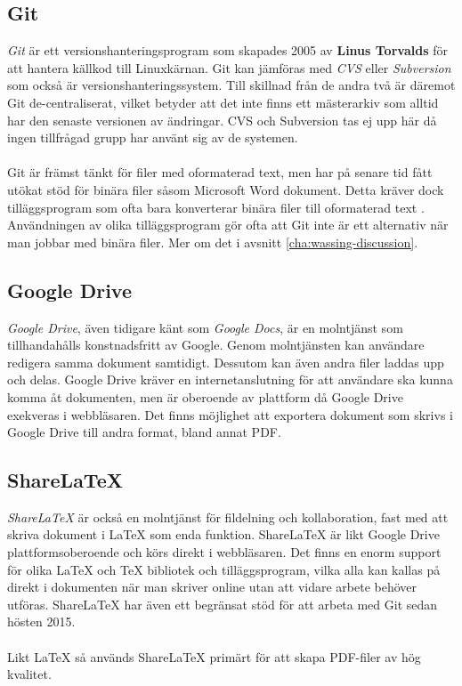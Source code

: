 \subsection{Git}
\label{sec:wassing-git}
\textit{Git} är ett versionshanteringsprogram som skapades 2005 av \textbf{Linus Torvalds} för att hantera källkod till Linuxkärnan. \cite{website:git} \cite{website:git_version_control} Git kan jämföras med \textit{CVS} eller \textit{Subversion} som också är versionshanteringssystem. Till skillnad från de andra två är däremot Git de-centraliserat, vilket betyder att det inte finns ett mästerarkiv som alltid har den senaste versionen av ändringar.\cite{website:centralized_version_control} CVS och Subversion tas ej upp här då ingen tillfrågad grupp har använt sig av de systemen.
\\ \\
Git är främst tänkt för filer med oformaterad text, men har på senare tid fått utökat stöd för binära filer såsom Microsoft Word dokument. Detta kräver dock tilläggsprogram som ofta bara konverterar binära filer till oformaterad text \cite{website:using_git_with_word}. Användningen av olika tilläggsprogram gör ofta att Git inte är ett alternativ när man jobbar med binära filer. Mer om det i avsnitt \ref{cha:wassing-discussion}.

\subsection{Google Drive}
\textit{Google Drive}, även tidigare känt som \textit{Google Docs}, är en molntjänst som tillhandahålls konstnadsfritt av Google.\cite{website:googledrive} Genom molntjänsten kan användare redigera samma dokument samtidigt. Dessutom kan även andra filer laddas upp och delas. Google Drive kräver en internetanslutning för att användare ska kunna komma åt dokumenten, men är oberoende av plattform då Google Drive exekveras i webbläsaren. Det finns möjlighet att exportera dokument som skrivs i Google Drive till andra format, bland annat PDF.

\subsection{ShareLaTeX}
\textit{ShareLaTeX} är också en molntjänst för fildelning och kollaboration, fast med att skriva dokument i LaTeX som enda funktion.\cite{website:sharelatex} ShareLaTeX  är likt Google Drive plattformsoberoende och körs direkt i webbläsaren. Det finns en enorm support för olika LaTeX och TeX bibliotek och tilläggsprogram, vilka alla kan kallas på direkt i dokumenten när man skriver online utan att vidare arbete behöver utföras. ShareLaTeX har även ett begränsat stöd för att arbeta med Git sedan hösten 2015.\cite{website:sharelatex_git_sync}
\\ \\
Likt LaTeX så används ShareLaTeX primärt för att skapa PDF-filer av hög kvalitet.

